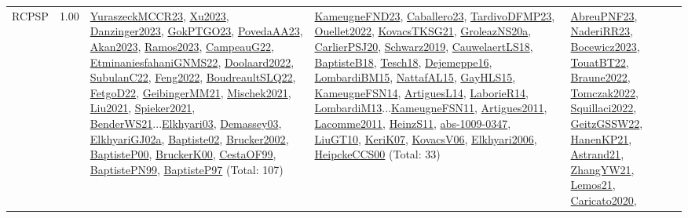 {\begin{longtable}{p{3cm}r>{\raggedright\arraybackslash}p{6cm}>{\raggedright\arraybackslash}p{6cm}>{\raggedright\arraybackslash}p{8cm}}
\index{RCPSP}\index{Classification!RCPSP}RCPSP &  1.00 & \hyperref[detail:YuraszeckMCCR23]{YuraszeckMCCR23}, \hyperref[detail:Xu2023]{Xu2023}, \hyperref[detail:Danzinger2023]{Danzinger2023}, \hyperref[detail:GokPTGO23]{GokPTGO23}, \hyperref[detail:PovedaAA23]{PovedaAA23}, \hyperref[detail:Akan2023]{Akan2023}, \hyperref[detail:Ramos2023]{Ramos2023}, \hyperref[detail:CampeauG22]{CampeauG22}, \hyperref[detail:EtminaniesfahaniGNMS22]{EtminaniesfahaniGNMS22}, \hyperref[detail:Doolaard2022]{Doolaard2022}, \hyperref[detail:SubulanC22]{SubulanC22}, \hyperref[detail:Feng2022]{Feng2022}, \hyperref[detail:BoudreaultSLQ22]{BoudreaultSLQ22}, \hyperref[detail:FetgoD22]{FetgoD22}, \hyperref[detail:GeibingerMM21]{GeibingerMM21}, \hyperref[detail:Mischek2021]{Mischek2021}, \hyperref[detail:Liu2021]{Liu2021}, \hyperref[detail:Spieker2021]{Spieker2021}, \hyperref[detail:BenderWS21]{BenderWS21}...\hyperref[detail:Elkhyari03]{Elkhyari03}, \hyperref[detail:Demassey03]{Demassey03}, \hyperref[detail:ElkhyariGJ02a]{ElkhyariGJ02a}, \hyperref[detail:Baptiste02]{Baptiste02}, \hyperref[detail:Brucker2002]{Brucker2002}, \hyperref[detail:BaptisteP00]{BaptisteP00}, \hyperref[detail:BruckerK00]{BruckerK00}, \hyperref[detail:CestaOF99]{CestaOF99}, \hyperref[detail:BaptistePN99]{BaptistePN99}, \hyperref[detail:BaptisteP97]{BaptisteP97} (Total: 107) & \hyperref[detail:KameugneFND23]{KameugneFND23}, \hyperref[detail:Caballero23]{Caballero23}, \hyperref[detail:TardivoDFMP23]{TardivoDFMP23}, \hyperref[detail:Ouellet2022]{Ouellet2022}, \hyperref[detail:KovacsTKSG21]{KovacsTKSG21}, \hyperref[detail:GroleazNS20a]{GroleazNS20a}, \hyperref[detail:CarlierPSJ20]{CarlierPSJ20}, \hyperref[detail:Schwarz2019]{Schwarz2019}, \hyperref[detail:CauwelaertLS18]{CauwelaertLS18}, \hyperref[detail:BaptisteB18]{BaptisteB18}, \hyperref[detail:Tesch18]{Tesch18}, \hyperref[detail:Dejemeppe16]{Dejemeppe16}, \hyperref[detail:LombardiBM15]{LombardiBM15}, \hyperref[detail:NattafAL15]{NattafAL15}, \hyperref[detail:GayHLS15]{GayHLS15}, \hyperref[detail:KameugneFSN14]{KameugneFSN14}, \hyperref[detail:ArtiguesL14]{ArtiguesL14}, \hyperref[detail:LaborieR14]{LaborieR14}, \hyperref[detail:LombardiM13]{LombardiM13}...\hyperref[detail:KameugneFSN11]{KameugneFSN11}, \hyperref[detail:Artigues2011]{Artigues2011}, \hyperref[detail:Lacomme2011]{Lacomme2011}, \hyperref[detail:HeinzS11]{HeinzS11}, \hyperref[detail:abs-1009-0347]{abs-1009-0347}, \hyperref[detail:LiuGT10]{LiuGT10}, \hyperref[detail:KeriK07]{KeriK07}, \hyperref[detail:KovacsV06]{KovacsV06}, \hyperref[detail:Elkhyari2006]{Elkhyari2006}, \hyperref[detail:HeipckeCCS00]{HeipckeCCS00} (Total: 33) & \hyperref[detail:AbreuPNF23]{AbreuPNF23}, \hyperref[detail:NaderiRR23]{NaderiRR23}, \hyperref[detail:Bocewicz2023]{Bocewicz2023}, \hyperref[detail:TouatBT22]{TouatBT22}, \hyperref[detail:Braune2022]{Braune2022}, \hyperref[detail:Tomczak2022]{Tomczak2022}, \hyperref[detail:Squillaci2022]{Squillaci2022}, \hyperref[detail:GeitzGSSW22]{GeitzGSSW22}, \hyperref[detail:HanenKP21]{HanenKP21}, \hyperref[detail:Astrand21]{Astrand21}, \hyperref[detail:ZhangYW21]{ZhangYW21}, \hyperref[detail:Lemos21]{Lemos21}, \hyperref[detail:Caricato2020]{Caricato2020}, 
\end{longtable}}
